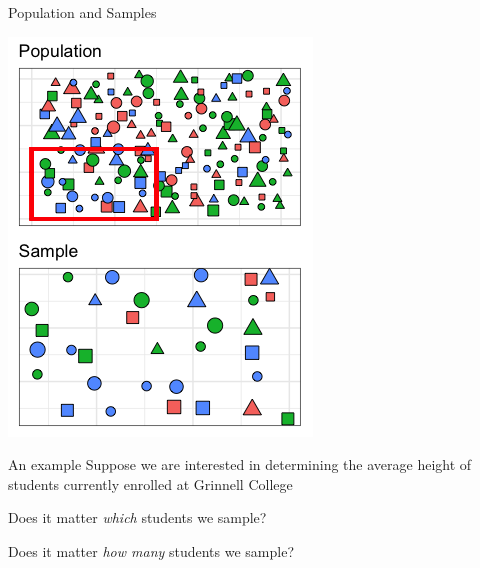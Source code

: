 \documentclass{beamer}
\begin{document}
\begin{frame}{Population and Samples}
\begin{center}
\includegraphics[scale=0.5]{img/pop_sample.png}
\end{center}
\end{frame}

\begin{frame}{An example}
Suppose we are interested in determining the average height of students currently enrolled at Grinnell College  \vspace{4mm}

Does it matter \textit{which} students we sample? \vspace{4mm}

Does it matter \textit{how many} students we sample? \vspace{4mm}

\end{frame}
%
%
%
%
%
%
\end{document}
